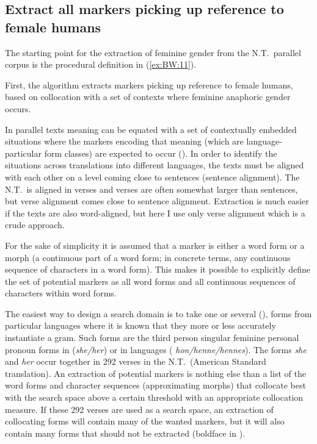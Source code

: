 \documentclass[output=collectionpaper]{langsci/langscibook}
\begin{document}
\subsection{Extract all markers picking up reference to female humans}
\label{sec:BW:3.2}

The starting point for the extraction of feminine gender from the N.T.\ parallel corpus is the procedural definition in (\ref{ex:BW:11}).

First, the algorithm extracts markers picking up reference to female humans, based on collocation with a set of contexts where feminine anaphoric gender occurs.

In parallel texts meaning can be equated with a set of contextually embedded situations where the markers encoding that meaning (which are language-particular form classes) are expected to occur (\citealt[672]{Waelchli2012}). In order to identify the situations across translations into different languages, the texts must be aligned with each other on a level coming close to sentences (sentence alignment). The N.T.\ is aligned in verses and verses are often somewhat larger than sentences, but verse alignment comes close to sentence alignment. Extraction is much easier if the texts are also word-aligned, but here I use only verse alignment which is a crude approach.

For the sake of simplicity it is assumed that a marker is either a word form or a morph (a continuous part of a word form; in concrete terms, any continuous sequence of characters in a word form). This makes it possible to explicitly define the set of potential markers as all word forms and all continuous sequences of characters within word forms.

The easiest way to design a search domain is to take one or several  (\citealt{Dahl2016}), forms from particular languages where it is known that they more or less accurately instantiate a gram. Such forms are the third person singular feminine personal pronoun forms in  (\textit{she/her}) or in  languages ( \textit{hon/henne/hennes}). The  forms \textit{she} and \textit{her} occur together in 292 verses in the N.T.\ (American Standard translation). An extraction of potential markers is nothing else than a list of the word forms and character sequences (approximating morphs) that collocate best with the search space above a certain threshold with an appropriate collocation measure. If these 292 verses are used as a search space, an extraction of collocating forms will contain many of the wanted markers, but it will also contain many forms that should not be extracted (boldface in ).
\end{document}
